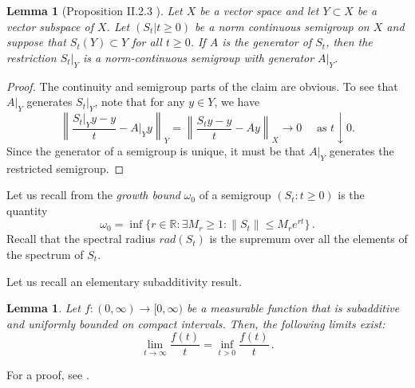 \documentclass{article}
\newcommand{\<}{\langle}
\renewcommand{\>}{\rangle}
\numberwithin{equation}{section}
\newtheorem{lem}[thm]{Lemma}
\theoremstyle{definition}
\begin{document}
\begin{lem}[Proposition II.2.3 \cite{EngelNagel_Short}]\label{lem:subspace_semigroup}
	Let $X$ be a vector space and let $Y\subset X$ be a vector subspace of $X$. Let $(S_t|t\ge 0)$ be a norm continuous semigroup on $X$ and suppose that $S_t(Y)\subset Y$ for all $t\ge 0$. If $A$ is the generator of $S_t$, then the restriction $S_t|_Y$ is a norm-continuous semigroup with generator $A|_Y$. 
\end{lem}
\begin{proof}
	The continuity and semigroup parts of the claim are obvious. To see that $A|_Y$ generates $S_t|_Y$, note that for any $y\in Y$, we have 
	\begin{equation}
		\left \|\frac{S_t|_Y y - y}{t} - A|_Y y\right \|_Y = \left\|\frac{S_ty - y }{t}- Ay\right\|_X \to 0 \quad \text{ as } t\downarrow 0.
	\end{equation}  Since the generator of a semigroup is unique, it must be that $A|_Y$ generates the restricted semigroup. 
\end{proof}

Let us recall from \cite[Definition I.1.5]{EngelNagel_Short} the \textit{growth bound} $\omega_0$ of a semigroup $(S_t : t\ge 0)$ is the quantity \begin{equation} \omega_0 = \inf \{r \in \mathbb{R}: \exists M_r\ge 1 \colon \|S_t\|\le M_re^{rt}\}\,.\end{equation} Recall that the spectral radius $rad(S_t)$ is the supremum over all the elements of the spectrum of $S_t$. 

Let us recall an elementary subadditivity result. 
\begin{lem}\label{lem:Fekete}
Let $f:(0, \infty) \to [0, \infty)$ be a measurable function that is subadditive and uniformly bounded on compact intervals. Then, the following limits exist:
	\begin{equation}
		\lim_{t\to \infty} \frac{f(t)}{t} = \inf_{t>0} \frac{f(t)}{t}\,.
	\end{equation}
\end{lem} For a proof, see \cite[Lemma V.1.23]{EngelNagel_Short}.
\end{document}
